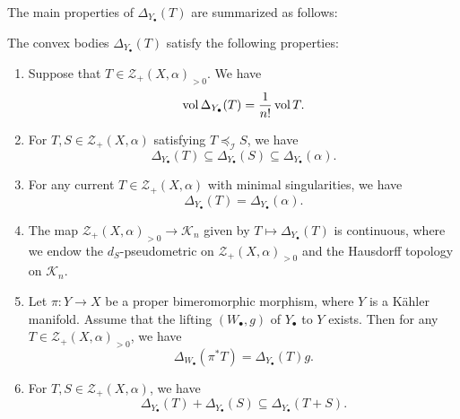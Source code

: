 The main properties of $\Delta_{Y_{\bullet}}(T)$ are summarized as follows:
\begin{theorem}\label{thm:pobmain}
The convex bodies $\Delta_{Y_{\bullet}}(T)$ satisfy the following properties:
\begin{enumerate}
    \item\label{itm:thm:pobmain:1} Suppose that $T\in \mathcal{Z}_+(X,\alpha)_{>0}$. We have
    \begin{equation}\label{eq:volpobgeneral}
        \operatorname{vol} \Delta_{Y_{\bullet}}(T)=\frac{1}{n!}\operatorname{vol} T.
    \end{equation}
    \item\label{itm:thm:pobmain:2} For $T,S \in \mathcal{Z}_+(X,\alpha)$ satisfying $T\preceq_{\mathcal{I}}S$, we have
    \[
        \Delta_{Y_{\bullet}}(T)\subseteq \Delta_{Y_{\bullet}}(S)\subseteq \Delta_{Y_{\bullet}}(\alpha).
    \]
    \item\label{itm:thm:pobmain:3} For any current $T\in \mathcal{Z}_+(X,\alpha)$ with minimal singularities, we have
    \[
    \Delta_{Y_{\bullet}}(T)=\Delta_{Y_{\bullet}}(\alpha).
    \]
    \item\label{itm:thm:pobmain:4} The map $\mathcal{Z}_+(X,\alpha)_{>0}\rightarrow \mathcal{K}_n$ given by $T\mapsto \Delta_{Y_{\bullet}}(T)$ is continuous, where we endow the $d_S$-pseudometric on $\mathcal{Z}_+(X,\alpha)_{>0}$ and the Hausdorff topology on $\mathcal{K}_n$.
    \item\label{itm:thm:pobmain:5} Let $\pi\colon Y\rightarrow X$ be a proper bimeromorphic morphism, where $Y$ is a Kähler manifold. Assume that the lifting $(W_{\bullet},g)$ of $Y_{\bullet}$ to $Y$ exists. Then for any $T\in \mathcal{Z}_+(X,\alpha)_{>0}$, we have
    \[
        \Delta_{W_{\bullet}}(\pi^*T)=\Delta_{Y_{\bullet}}(T)g.
    \]
    \item\label{itm:thm:pobmain:6} For $T,S\in \mathcal{Z}_+(X,\alpha)$, we have
    \begin{equation}\label{eq:pobadditiv}
    \Delta_{Y_{\bullet}}(T)+\Delta_{Y_{\bullet}}(S)\subseteq \Delta_{Y_{\bullet}}(T+S).
    \end{equation}
\end{enumerate}
\end{theorem}

